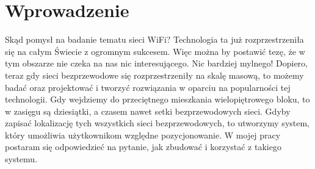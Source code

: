 \chapter*{Wprowadzenie}
\label{ch:wprowadz}

Skąd pomysł na badanie tematu sieci WiFi? Technologia ta już rozprzestrzeniła się na całym Świecie z ogromnym sukcesem. Więc można by postawić tezę, że w tym obszarze nie czeka na nas nic interesującego. Nic bardziej mylnego! Dopiero, teraz gdy sieci bezprzewodowe się rozprzestrzeniły na skalę masową, to możemy badać oraz projektować i tworzyć rozwiązania w oparciu na popularności tej technologii. Gdy wejdziemy do przeciętnego mieszkania wielopiętrowego bloku, to w zasięgu są dziesiątki, a czasem nawet setki bezprzewodowych sieci. Gdyby zapisać lokalizację tych wszystkich sieci bezprzewodowych, to utworzymy system, który umożliwia użytkownikom względne pozycjonowanie. W mojej pracy postaram się odpowiedzieć na pytanie, jak zbudować i korzystać z takiego systemu.
